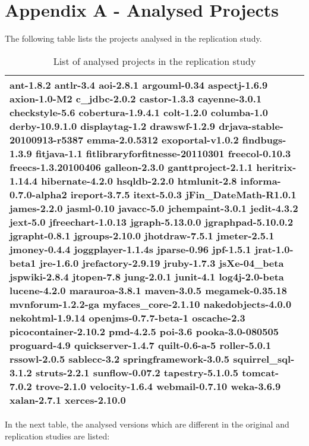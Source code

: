 \documentclass{uvamscse}
\begin{document}
\section{\\Appendix A - Analysed Projects} \label{App:AppendixA}
The following table lists the projects analysed in the replication study.
\begin{table} [h!]
\begin{flushleft}
\begin{tabular}[c]{ |p{150mm} |}
  \hline
  ant-1.8.2   antlr-3.4   aoi-2.8.1   argouml-0.34   aspectj-1.6.9  axion-1.0-M2   c\_jdbc-2.0.2   castor-1.3.3   cayenne-3.0.1    checkstyle-5.6   cobertura-1.9.4.1   colt-1.2.0   columba-1.0   derby-10.9.1.0   displaytag-1.2   drawswf-1.2.9 drjava-stable-20100913-r5387   emma-2.0.5312   exoportal-v1.0.2   findbugs-1.3.9   fitjava-1.1   fitlibraryforfitnesse-20110301 freecol-0.10.3   freecs-1.3.20100406   galleon-2.3.0   ganttproject-2.1.1    heritrix-1.14.4   hibernate-4.2.0    hsqldb-2.2.0   htmlunit-2.8   informa-0.7.0-alpha2   ireport-3.7.5   itext-5.0.3   jFin\_DateMath-R1.0.1   james-2.2.0   jasml-0.10   javacc-5.0   jchempaint-3.0.1   jedit-4.3.2   jext-5.0   jfreechart-1.0.13   jgraph-5.13.0.0   jgraphpad-5.10.0.2   jgrapht-0.8.1   jgroups-2.10.0   jhotdraw-7.5.1   jmeter-2.5.1   jmoney-0.4.4   joggplayer-1.1.4s   jparse-0.96   jpf-1.5.1  jrat-1.0-beta1   jre-1.6.0   jrefactory-2.9.19   jruby-1.7.3   jsXe-04\_beta   jspwiki-2.8.4   jtopen-7.8   jung-2.0.1    junit-4.1   log4j-2.0-beta   lucene-4.2.0   marauroa-3.8.1   maven-3.0.5   megamek-0.35.18   mvnforum-1.2.2-ga   myfaces\_core-2.1.10   nakedobjects-4.0.0   nekohtml-1.9.14   openjms-0.7.7-beta-1   oscache-2.3   picocontainer-2.10.2   pmd-4.2.5   poi-3.6   pooka-3.0-080505   proguard-4.9   quickserver-1.4.7   quilt-0.6-a-5   roller-5.0.1   rssowl-2.0.5   sablecc-3.2   springframework-3.0.5   squirrel\_sql-3.1.2   struts-2.2.1   sunflow-0.07.2   tapestry-5.1.0.5   tomcat-7.0.2   trove-2.1.0   velocity-1.6.4   webmail-0.7.10   weka-3.6.9   xalan-2.7.1   xerces-2.10.0
 \\
  \hline 
\end{tabular}
\end{flushleft}
\caption{List of analysed projects in the replication study}
\label{table:ListProjectsReplication}
\end{table}

In the next table, the analysed versions which are different in the original and replication studies are listed:
\end{document}
